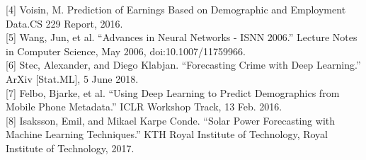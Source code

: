 \documentclass{article}
\begin{document}
	[4] Voisin, M. Prediction of Earnings Based on Demographic and Employment Data.CS 229 Report, 2016.\\ [0.5pt]
	
	[5] Wang, Jun, et al. “Advances in Neural Networks - ISNN 2006.” Lecture Notes in Computer Science, May 2006, doi:10.1007/11759966.\\ [0.5pt]
	
	[6] Stec, Alexander, and Diego Klabjan. “Forecasting Crime with Deep Learning.” ArXiv [Stat.ML], 5 June 2018.\\ [0.5pt]
	
	[7] Felbo, Bjarke, et al. “Using Deep Learning to Predict Demographics from Mobile Phone Metadata.” ICLR Workshop Track, 13 Feb. 2016.\\ [0.5pt]
	
	[8] Isaksson, Emil, and Mikael Karpe Conde. “Solar Power Forecasting with Machine Learning Techniques.” KTH Royal Institute of Technology, Royal Institute of Technology, 2017.\\ [0.5pt]
\end{document}
